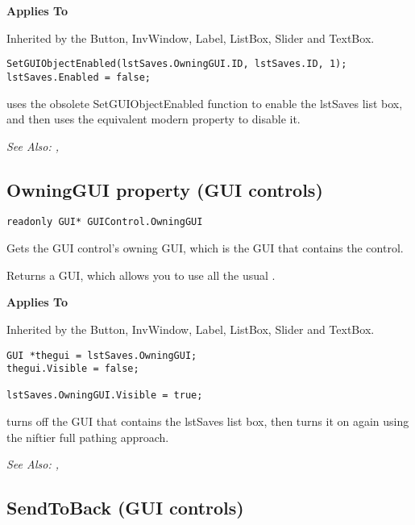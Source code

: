 \bf{Applies To}

Inherited by the Button, InvWindow, Label, ListBox, Slider and TextBox.

\begin{verbatim}
SetGUIObjectEnabled(lstSaves.OwningGUI.ID, lstSaves.ID, 1);
lstSaves.Enabled = false;
\end{verbatim}
uses the obsolete SetGUIObjectEnabled function to enable the lstSaves list box,
and then uses the equivalent modern property to disable it.

\it{See Also:} , 



\subsection{OwningGUI property (GUI controls)}\label{GUIControl.OwningGUI}%

\begin{verbatim}
readonly GUI* GUIControl.OwningGUI
\end{verbatim}
Gets the GUI control's owning GUI, which is the GUI that contains the control.

Returns a GUI, which allows you to use all the usual
.

\bf{Applies To}

Inherited by the Button, InvWindow, Label, ListBox, Slider and TextBox.

\begin{verbatim}
GUI *thegui = lstSaves.OwningGUI;
thegui.Visible = false;

lstSaves.OwningGUI.Visible = true;
\end{verbatim}
turns off the GUI that contains the lstSaves list box, then turns it on again using
the niftier full pathing approach.

\it{See Also:} , 


\subsection{SendToBack (GUI controls)}\label{GUIControl.SendToBack}%

